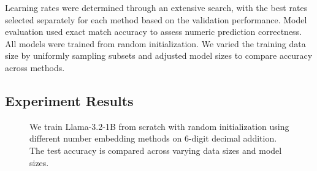 Learning rates were determined through an extensive search, with the best rates selected separately for each method based on the validation performance. 
Model evaluation used exact match accuracy to assess numeric prediction correctness. All models were trained from random initialization. We varied the training data size by uniformly sampling subsets and adjusted model sizes to compare accuracy across methods.

\subsection{Experiment Results}
\label{sec:exp_results}
\ifdefined\isarxiv
 \begin{figure*}[!ht]
\centering
{}
\caption{
We train Llama-3.2-1B from scratch with random initialization using different number embedding methods on 6-digit decimal addition. The test accuracy is compared across varying data sizes and model sizes.
}
\label{fig:6digitdecimalacc}
\end{figure*}


